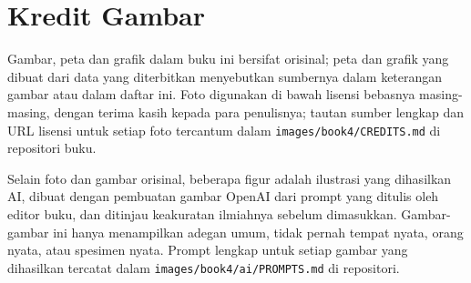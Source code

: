 \chapter*{Kredit Gambar}

Gambar, peta dan grafik dalam buku ini bersifat orisinal; peta dan grafik yang
dibuat dari data yang diterbitkan menyebutkan sumbernya dalam keterangan gambar
atau dalam daftar ini. Foto digunakan di bawah lisensi bebasnya masing-masing,
dengan terima kasih kepada para penulisnya; tautan sumber lengkap dan URL lisensi
untuk setiap foto tercantum dalam \texttt{images/book4/CREDITS.md} di repositori buku.

\bigskip
Selain foto dan gambar orisinal, beberapa figur adalah ilustrasi yang dihasilkan AI,
dibuat dengan pembuatan gambar OpenAI dari prompt yang ditulis oleh editor buku, dan
ditinjau keakuratan ilmiahnya sebelum dimasukkan. Gambar-gambar ini hanya menampilkan
adegan umum, tidak pernah tempat nyata, orang nyata, atau spesimen nyata. Prompt
lengkap untuk setiap gambar yang dihasilkan tercatat dalam
\texttt{images/book4/ai/PROMPTS.md} di repositori.

